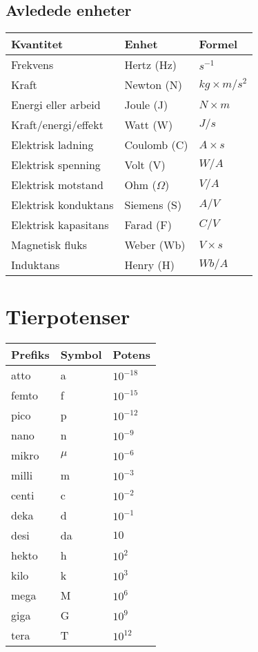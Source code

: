 \documentclass[norsk, a4paper, 12pt, twoside, titlepage]{article}
\begin{document}
\subsection{Avledede enheter}
\begin{tabular}{|p{7.5cm}|p{3cm}|p{3cm}|}
\hline
Kvantitet & Enhet & Formel \\
\hline
Frekvens & Hertz (Hz) & $s^{-1}$ \\
Kraft & Newton (N) & $kg \times m/s^{2}$ \\
Energi eller arbeid & Joule (J) & $N \times m$ \\
Kraft/energi/effekt & Watt (W) & $J/s$ \\
Elektrisk ladning & Coulomb (C) & $A \times s$ \\
Elektrisk spenning & Volt (V) & $W/A$ \\
Elektrisk motstand & Ohm ($\Omega$) & $V/A$ \\
Elektrisk konduktans & Siemens (S) & $A/V$ \\
Elektrisk kapasitans & Farad (F) & $C/V$ \\
Magnetisk fluks & Weber (Wb) & $V \times s$ \\
Induktans & Henry (H) & $Wb/A$ \\
\hline
\end{tabular}


\newpage
\section{Tierpotenser}
\begin{tabular}{|p{7.5cm}|p{3cm}|p{3cm}|}
\hline
Prefiks & Symbol & Potens \\
\hline
atto & a & $10^{-18}$ \\
femto & f & $10^{-15}$ \\
pico & p & $10^{-12}$ \\
nano & n & $10^{-9}$ \\
mikro & $\mu$ & $10^{-6}$ \\
milli & m & $10^{-3}$ \\
centi & c & $10^{-2}$ \\
deka & d & $10^{-1}$ \\
desi & da & $10$ \\
hekto & h & $10^{2}$ \\
kilo & k & $10^{3}$ \\
mega & M & $10^{6}$ \\
giga & G & $10^{9}$ \\
tera & T & $10^{12}$ \\
\hline
\end{tabular}
\end{document}
